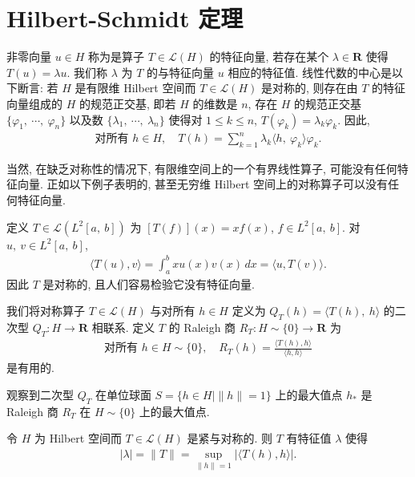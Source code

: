\documentclass[../../main.tex]{subfiles}
\begin{document}
\section{Hilbert-Schmidt 定理}\label{section:ch16-hilbert-schmidt}

非零向量 $u\in H$ 称为是算子 $T\in\mathcal{L}(H)$ 的特征向量, 若存在某个 $\lambda\in\mathbf{R}$ 使得 $T(u)=\lambda u$. 我们称 $\lambda$ 为 $T$ 的与特征向量 $u$ 相应的特征值. 线性代数的中心是以下断言: 若 $H$ 是有限维 Hilbert 空间而 $T\in\mathcal{L}(H)$ 是对称的, 则存在由 $T$ 的特征向量组成的 $H$ 的规范正交基, 即若 $H$ 的维数是 $n$, 存在 $H$ 的规范正交基 $\{\varphi_{1},\ \cdots,\ \varphi_{n}\}$ 以及数 $\{\lambda_{1},\ \cdots,\ \lambda_{n}\}$ 使得对 $1\leqslant k\leqslant n$, $T(\varphi_{k})=\lambda_{k}\varphi_{k}$. 因此,
\begin{align}
\text{对所有 }h\in H,\quad T(h)=\sum_{k=1}^{n}\lambda_{k}\langle h,\ \varphi_{k}\rangle\varphi_{k}.\label{align:ch16-finite-spectral}
\end{align}

当然, 在缺乏对称性的情况下, 有限维空间上的一个有界线性算子, 可能没有任何特征向量. 正如以下例子表明的, 甚至无穷维 Hilbert 空间上的对称算子可以没有任何特征向量.

\begin{example}\label{example:ch16-multiplication-operator}
定义 $T\in\mathcal{L}(L^{2}[a,\ b])$ 为 $[T(f)](x)=xf(x)$, $f\in L^{2}[a,\ b]$. 对 $u,\ v\in L^{2}[a,\ b]$,
\begin{align*}
\langle T(u),v\rangle=\int_{a}^{b}xu(x)v(x)\,dx=\langle u,T(v)\rangle.
\end{align*}
因此 $T$ 是对称的, 且人们容易检验它没有特征向量.
\end{example}

我们将对称算子 $T\in\mathcal{L}(H)$ 与对所有 $h\in H$ 定义为 $Q_{T}(h)=\langle T(h),\ h\rangle$ 的二次型 $Q_{T}:H\to\mathbf{R}$ 相联系. 定义 $T$ 的 Raleigh 商 $R_{T}:H\sim\{0\}\to\mathbf{R}$ 为
\begin{align*}
\text{对所有 }h\in H\sim\{0\},\quad R_{T}(h)=\frac{\langle T(h),h\rangle}{\langle h,h\rangle}
\end{align*}
是有用的.

观察到二次型 $Q_{T}$ 在单位球面 $S=\{h\in H\mid\|h\|=1\}$ 上的最大值点 $h_{*}$ 是 Raleigh 商 $R_{T}$ 在 $H\sim\{0\}$ 上的最大值点.

\begin{lemma}\label{lemma:ch16-hilbert-schmidt}
令 $H$ 为 Hilbert 空间而 $T\in\mathcal{L}(H)$ 是紧与对称的. 则 $T$ 有特征值 $\lambda$ 使得
\begin{align}
|\lambda|=\|T\|=\sup_{\|h\|=1}|\langle T(h),h\rangle|.\label{align:ch16-hs-lemma}
\end{align}
\end{lemma}
\end{document}

